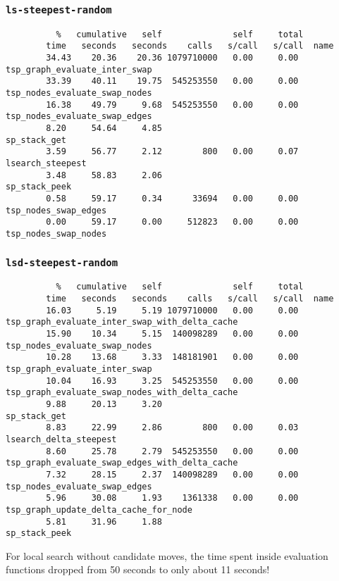 \documentclass[14pt]{article}
\begin{document}
\subsubsection*{\texttt{ls-steepest-random}}
\vspace{-6mm}
\begin{listing}[H]
	\begin{verbatim}
		  %   cumulative   self              self     total
		time   seconds   seconds    calls   s/call   s/call  name
		34.43    20.36    20.36 1079710000   0.00     0.00  tsp_graph_evaluate_inter_swap
		33.39    40.11    19.75  545253550   0.00     0.00  tsp_nodes_evaluate_swap_nodes
		16.38    49.79     9.68  545253550   0.00     0.00  tsp_nodes_evaluate_swap_edges
		8.20     54.64     4.85                             sp_stack_get
		3.59     56.77     2.12        800   0.00     0.07  lsearch_steepest
		3.48     58.83     2.06                             sp_stack_peek
		0.58     59.17     0.34      33694   0.00     0.00  tsp_nodes_swap_edges
		0.00     59.17     0.00     512823   0.00     0.00  tsp_nodes_swap_nodes
	\end{verbatim}
\end{listing}
\vspace{-15mm}
\subsubsection*{\texttt{lsd-steepest-random}}
\vspace{-6mm}
\begin{listing}[H]
	\begin{verbatim}
		  %   cumulative   self              self     total
		time   seconds   seconds    calls   s/call   s/call  name
		16.03     5.19     5.19 1079710000   0.00     0.00  tsp_graph_evaluate_inter_swap_with_delta_cache
		15.90    10.34     5.15  140098289   0.00     0.00  tsp_nodes_evaluate_swap_nodes
		10.28    13.68     3.33  148181901   0.00     0.00  tsp_graph_evaluate_inter_swap
		10.04    16.93     3.25  545253550   0.00     0.00  tsp_graph_evaluate_swap_nodes_with_delta_cache
		9.88     20.13     3.20                             sp_stack_get
		8.83     22.99     2.86        800   0.00     0.03  lsearch_delta_steepest
		8.60     25.78     2.79  545253550   0.00     0.00  tsp_graph_evaluate_swap_edges_with_delta_cache
		7.32     28.15     2.37  140098289   0.00     0.00  tsp_nodes_evaluate_swap_edges
		5.96     30.08     1.93    1361338   0.00     0.00  tsp_graph_update_delta_cache_for_node
		5.81     31.96     1.88                             sp_stack_peek
	\end{verbatim}
\end{listing}
\noindent
For local search without candidate moves, the time spent inside evaluation
functions dropped from 50 seconds to only about 11 seconds!
\end{document}
